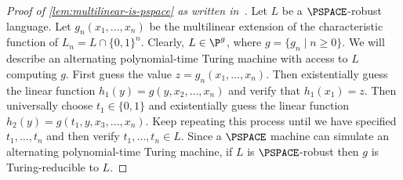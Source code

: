 \documentclass[english,12pt]{reedthesis}
\theoremstyle{plain}
\newtheorem{thm}{Theorem}[section]
\theoremstyle{definition}
\theoremstyle{remark}
\begin{document}
\begin{appendices}
\begin{proof}[{Proof of \cref{lem:multilinear-is-pspace} as written in~\cite{BFL90}}]
  Let $L$ be a $\PSPACE$-robust language. Let $g_{n}(x_{1}, \ldots, x_{n})$ be the
  multilinear extension of the characteristic function of
  $L_{n} = L \cap \{0, 1\}^{n}$. Clearly, $L \in \P^{g}$, where
  $g = \{g_{n} \mid n \ge 0\}$. We will describe an alternating polynomial-time
  Turing machine with access to $L$ computing $g$. First guess the value
  $z = g_{n}(x_{1}, \ldots, x_{n})$. Then existentially guess the linear function
  $h_{1}(y) = g(y, x_{2}, \ldots, x_{n})$ and verify that $h_{1}(x_{1}) = z$. Then
  universally choose $t_{1} \in \{0, 1\}$ and existentially guess the linear
  function $h_{2}(y) = g(t_{1}, y, x_{3}, \ldots, x_{n})$. Keep repeating this
  process until we have specified $t_{1}, \ldots, t_{n}$ and then verify
  $t_{1}, \ldots, t_{n} \in L$. Since a $\PSPACE$ machine can simulate an alternating
  polynomial-time Turing machine, if $L$ is $\PSPACE$-robust then $g$ is
  Turing-reducible to $L$.
\end{proof}





\end{appendices}
\end{document}
